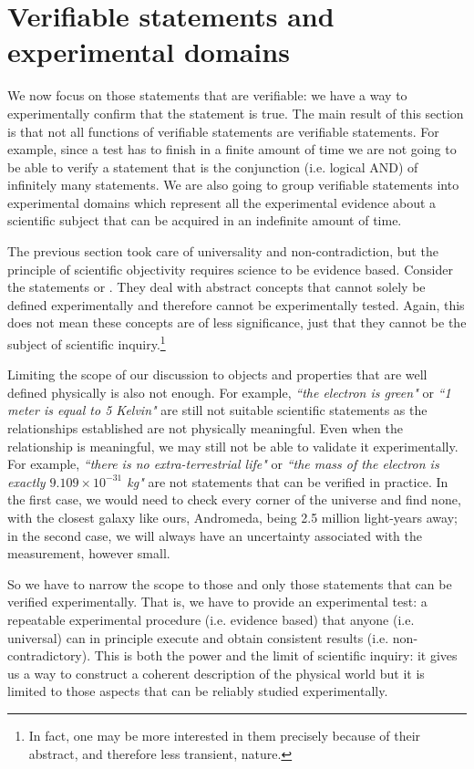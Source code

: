 \documentclass[11pt,letterpaper,fleqn]{memoir} %
\begin{document}
\section{Verifiable statements and experimental domains}

We now focus on those statements that are verifiable: we have a way to experimentally confirm that the statement is true. The main result of this section is that not all functions of verifiable statements are verifiable statements. For example, since a test has to finish in a finite amount of time we are not going to be able to verify a statement that is the conjunction (i.e. logical AND) of infinitely many statements. We are also going to group verifiable statements into experimental domains which represent all the experimental evidence about a scientific subject that can be acquired in an indefinite amount of time.

The previous section took care of universality and non-contradiction, but the principle of scientific objectivity requires science to be evidence based. Consider the statements  or . They deal with abstract concepts that cannot solely be defined experimentally and therefore cannot be experimentally tested. Again, this does not mean these concepts are of less significance, just that they cannot be the subject of scientific inquiry.\footnote{In fact, one may be more interested in them precisely because of their abstract, and therefore less transient, nature.}

Limiting the scope of our discussion to objects and properties that are well defined physically is also not enough. For example, \emph{``the electron is green"} or \emph{``1 meter is equal to 5 Kelvin"} are still not suitable scientific statements as the relationships established are not physically meaningful. Even when the relationship is meaningful, we may still not be able to validate it experimentally. For example, \emph{``there is no extra-terrestrial life"} or \emph{``the mass of the electron is exactly $9.109 \times 10^{-31}$ kg"} are not statements that can be verified in practice. In the first case, we would need to check every corner of the universe and find none, with the closest galaxy like ours, Andromeda, being 2.5 million light-years away; in the second case, we will always have an uncertainty associated with the measurement, however small.

So we have to narrow the scope to those and only those statements that can be verified experimentally. That is, we have to provide an experimental test: a repeatable experimental procedure (i.e. evidence based) that anyone (i.e. universal) can in principle execute and obtain consistent results (i.e. non-contradictory). This is both the power and the limit of scientific inquiry: it gives us a way to construct a coherent description of the physical world but it is limited to those aspects that can be reliably studied experimentally.
\end{document}
